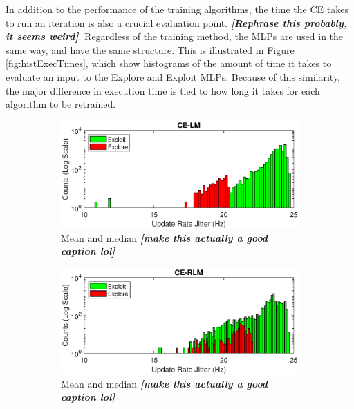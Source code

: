 \par In addition to the performance of the training algorithms, the time the CE takes to run an iteration is also a crucial evaluation point. \textbf{\textit{[Rephrase this probably, it seems weird]}}. Regardless of the training method, the MLPs are used in the same way, and have the same structure. This is illustrated in Figure \ref{fig:histExecTimes}, which show histograms of the amount of time it takes to evaluate an input to the Explore and Exploit MLPs. Because of this similarity, the major difference in execution time is tied to how long it takes for each algorithm to be retrained. 
\begin{figure}[ht]
\begin{subfigure}{\linewidth}
\centering
\includegraphics[scale=0.8]{figures/flight_results/coop_great_lm_updateRateJitter_log.eps}
\caption{Mean and median \textit{\textbf{[make this actually a good caption lol]}}}
\label{fig:flightCoopGreatMeanMed}
\end{subfigure} 
\begin{subfigure}{\linewidth}
\centering
\includegraphics[scale=0.8]{figures/flight_results/coop_great_rlm_updateRateJitter_log.eps}
\caption{Mean and median \textit{\textbf{[make this actually a good caption lol]}}}
\label{fig:flightCoopGoodMeanMed}
\end{subfigure}
\begin{subfigure}{\linewidth}

\end{subfigure}
\end{figure}
